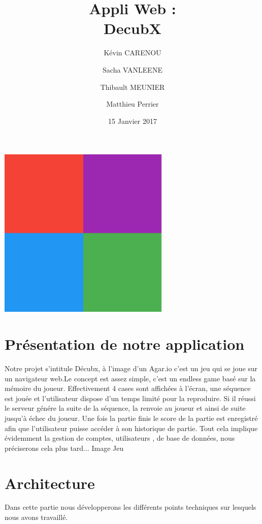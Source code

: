 \documentclass[12pt]{article}
\title{Appli Web :\\ DecubX }
\author{Kévin CARENOU \and Sacha VANLEENE \and Thibault MEUNIER \and Matthieu Perrier}
\date{15 Janvier 2017}
\begin{document}
\maketitle

\setcounter{page}{0}
\thispagestyle{empty} %
\begin{center}
\includegraphics[scale=1]{logo.png}
\end{center}

\newpage


\section*{Présentation de notre application}
Notre projet s'intitule Décubx, à l'image d'un Agar.io c'est un jeu qui se joue sur un navigateur web.Le concept est assez simple, c'est un endless game basé sur la mémoire du joueur. Effectivement 4 cases sont affichées à l'écran, une séquence est jouée et l'utilisateur dispose d'un temps limité pour la reproduire. Si il réussi le serveur génére la suite de la séquence, la renvoie au joueur et ainsi de suite jusqu'à échec du joueur. Une fois la partie finis le score de la partie est enregistré afin que l'utilisateur puisse accéder à son historique de partie. Tout cela implique évidemment la gestion de comptes, utilisateurs , de base de données, nous préciserons cela plus tard...
Image Jeu

\renewcommand{\contentsname}{Sommaire}
\tableofcontents
\newpage



\section{Architecture}
Dans cette partie nous développerons les différents points techniques sur lesquels nous avons travaillé.
~\newline
~\newline
~\newline
~\newline
~\newline
\end{document}
